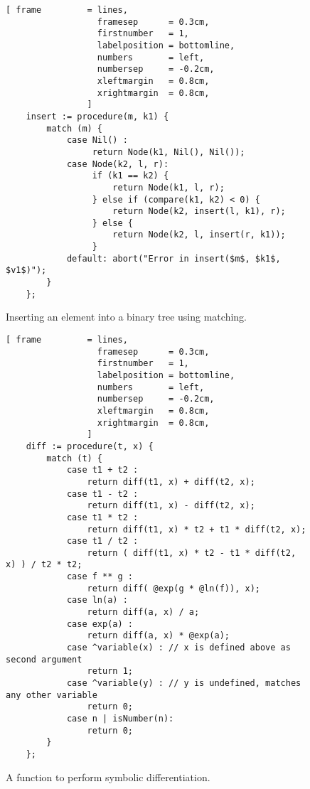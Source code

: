 \begin{figure}[!ht]
\centering
\begin{Verbatim}[ frame         = lines, 
                  framesep      = 0.3cm, 
                  firstnumber   = 1,
                  labelposition = bottomline,
                  numbers       = left,
                  numbersep     = -0.2cm,
                  xleftmargin   = 0.8cm,
                  xrightmargin  = 0.8cm,
                ]
    insert := procedure(m, k1) {
        match (m) {
            case Nil() : 
                 return Node(k1, Nil(), Nil());
            case Node(k2, l, r): 
                 if (k1 == k2) {
                     return Node(k1, l, r);
                 } else if (compare(k1, k2) < 0) { 
                     return Node(k2, insert(l, k1), r);
                 } else {
                     return Node(k2, l, insert(r, k1));
                 }
            default: abort("Error in insert($m$, $k1$, $v1$)");
        }
    };
\end{Verbatim}
\vspace*{-0.3cm}
\caption{Inserting an element into a binary tree using matching.}
\label{fig:binary-tree.stlx}
\end{figure}

\begin{figure}[!ht]
\centering
\begin{Verbatim}[ frame         = lines, 
                  framesep      = 0.3cm, 
                  firstnumber   = 1,
                  labelposition = bottomline,
                  numbers       = left,
                  numbersep     = -0.2cm,
                  xleftmargin   = 0.8cm,
                  xrightmargin  = 0.8cm,
                ]
    diff := procedure(t, x) {
        match (t) {
            case t1 + t2 :
                return diff(t1, x) + diff(t2, x);
            case t1 - t2 :
                return diff(t1, x) - diff(t2, x);
            case t1 * t2 :
                return diff(t1, x) * t2 + t1 * diff(t2, x);
            case t1 / t2 :
                return ( diff(t1, x) * t2 - t1 * diff(t2, x) ) / t2 * t2;
            case f ** g :
                return diff( @exp(g * @ln(f)), x);
            case ln(a) :
                return diff(a, x) / a;
            case exp(a) :
                return diff(a, x) * @exp(a);
            case ^variable(x) : // x is defined above as second argument
                return 1;
            case ^variable(y) : // y is undefined, matches any other variable
                return 0;
            case n | isNumber(n):   
                return 0;  
        }
    };
\end{Verbatim}
\vspace*{-0.3cm}
\caption{A function to perform symbolic differentiation.}
\label{fig:diff.stlx}
\end{figure}


